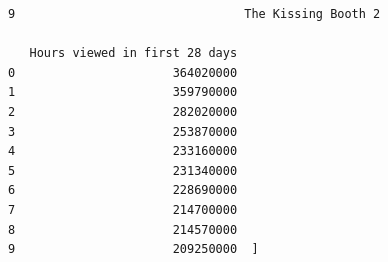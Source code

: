 \documentclass[
  letterpaper,
  DIV=11,
  numbers=noendperiod]{scrreprt}
\begin{document}
\begin{verbatim}
9                                The Kissing Booth 2                                                                                                                                                                                                                                                                                                                                                                                                                                                                                                                                                                                                                                                                                                                                                                                                                                                                                                                                                                                                                                                                                                                                                                                                                                                                                                                                                                                                                                                                                                                                                                                                                                                                                                                                                                                                                                                                                                                                                                                                                                                                                                                                                                                                                                                                                                                                                                                                                                                                                                                                                                                                                                                                                                                                                                                                                                                                                       

   Hours viewed in first 28 days  
0                      364020000  
1                      359790000  
2                      282020000  
3                      253870000  
4                      233160000  
5                      231340000  
6                      228690000  
7                      214700000  
8                      214570000  
9                      209250000  ]
\end{verbatim}
\end{document}
